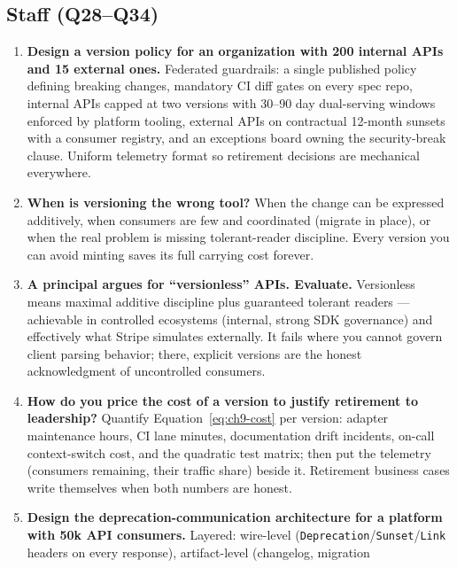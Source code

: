 \subsection*{Staff (Q28--Q34)}
\begin{enumerate}[label=\textbf{Q\arabic*.}, leftmargin=1.6cm, start=28]
  \item \textbf{Design a version policy for an organization with 200 internal
        APIs and 15 external ones.}
        Federated guardrails: a single published policy defining breaking
        changes, mandatory CI diff gates on every spec repo, internal APIs
        capped at two versions with 30--90 day dual-serving windows enforced
        by platform tooling, external APIs on contractual 12-month sunsets
        with a consumer registry, and an exceptions board owning the
        security-break clause. Uniform telemetry format so retirement
        decisions are mechanical everywhere.
  \item \textbf{When is versioning the wrong tool?}
        When the change can be expressed additively, when consumers are few
        and coordinated (migrate in place), or when the real problem is
        missing tolerant-reader discipline. Every version you can avoid
        minting saves its full carrying cost forever.
  \item \textbf{A principal argues for ``versionless'' APIs. Evaluate.}
        Versionless means maximal additive discipline plus guaranteed
        tolerant readers --- achievable in controlled ecosystems (internal,
        strong SDK governance) and effectively what Stripe simulates
        externally. It fails where you cannot govern client parsing behavior;
        there, explicit versions are the honest acknowledgment of
        uncontrolled consumers.
  \item \textbf{How do you price the cost of a version to justify retirement
        to leadership?}
        Quantify Equation~\ref{eq:ch9-cost} per version: adapter maintenance
        hours, CI lane minutes, documentation drift incidents, on-call
        context-switch cost, and the quadratic test matrix; then put the
        telemetry (consumers remaining, their traffic share) beside it.
        Retirement business cases write themselves when both numbers are
        honest.
  \item \textbf{Design the deprecation-communication architecture for a
        platform with 50k API consumers.}
        Layered: wire-level (\texttt{Deprecation}/\texttt{Sunset}/\texttt{Link}
        headers on every response), artifact-level (changelog, migration

\end{enumerate}

